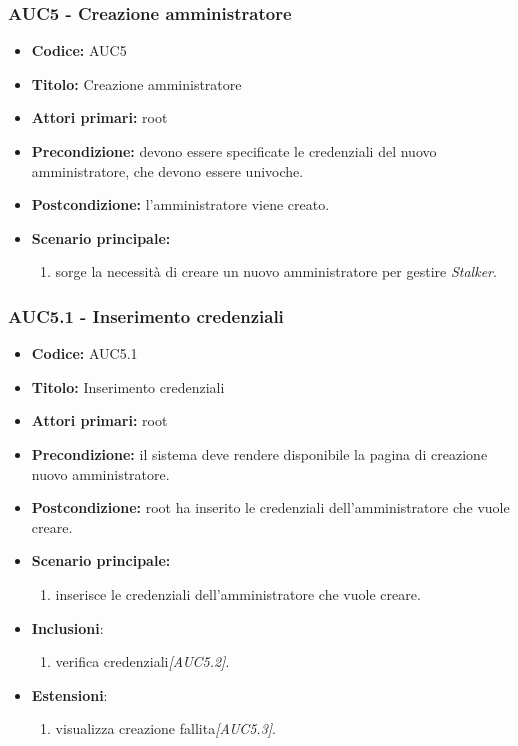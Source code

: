 \documentclass[casi-duso]{subfiles}
\begin{document}
\subsubsection{AUC5 - Creazione amministratore}%
\label{subsub:AUC5}
\begin{itemize}
  \item \textbf{Codice:} AUC5
  \item \textbf{Titolo:} Creazione amministratore
  \item \textbf{Attori primari:} root
  \item \textbf{Precondizione:} devono essere specificate le credenziali del nuovo amministratore, che devono essere univoche.
  \item \textbf{Postcondizione:} l'amministratore viene creato.
  \item \textbf{Scenario principale:}
  \begin{enumerate}
    \item sorge la necessità di creare un nuovo amministratore per gestire \emph{Stalker}.
  \end{enumerate}
\end{itemize}


\subsubsection{AUC5.1 - Inserimento credenziali}%
\label{subsub:AUC5.1}
\begin{itemize}
  \item \textbf{Codice:} AUC5.1
  \item \textbf{Titolo:} Inserimento credenziali
  \item \textbf{Attori primari:} root
  \item \textbf{Precondizione:} il sistema deve rendere disponibile la pagina di creazione nuovo amministratore.
  \item \textbf{Postcondizione:} root ha inserito le credenziali dell'amministratore che vuole creare.
  \item \textbf{Scenario principale:}
  \begin{enumerate}
    \item {} inserisce le credenziali dell'amministratore che vuole creare.
  \end{enumerate}
  \item \textbf{Inclusioni}:
  \begin{enumerate}
    \item verifica credenziali\emph{[AUC5.2]}.
  \end{enumerate}
  \item \textbf{Estensioni}:
  \begin{enumerate}
    \item  visualizza creazione fallita\emph{[AUC5.3]}.
  \end{enumerate}
\end{itemize}
\end{document}
